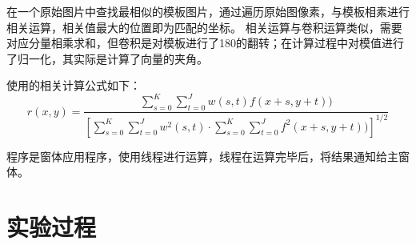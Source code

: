 ﻿\documentclass[12pt,a4paper,oneside]{book}
\begin{document}
在一个原始图片中查找最相似的模板图片，通过遍历原始图像素，与模板相素进行相关运算，相关值最大的位置即为匹配的坐标。
相关运算与卷积运算类似，需要对应分量相乘求和，但卷积是对模板进行了180的翻转；在计算过程中对模值进行了归一化，其实际是计算了向量的夹角。

使用的相关计算公式如下：
\begin{displaymath}
r(x,y)=\frac{
\sum_{s=0}^{K}\sum_{t=0}^{J}w(s,t)f(x+s,y+t))
}{
\left[
\sum_{s=0}^{K}\sum_{t=0}^{J}w^{2}(s,t)\cdot\sum_{s=0}^{K}\sum_{t=0}^{J}f^{2}(x+s,y+t))
\right]^{1/2}
}
\end{displaymath}

程序是窗体应用程序，使用线程进行运算，线程在运算完毕后，将结果通知给主窗体。

\section{实验过程}
\end{document}
